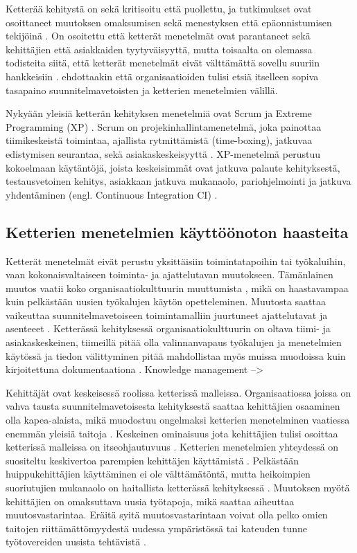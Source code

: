Ketterää kehitystä on sekä kritisoitu että puollettu, ja tutkimukset ovat
osoittaneet muutoksen omaksumisen sekä menestyksen että epäonnistumisen
tekijöinä . On osoitettu että ketterät menetelmät ovat
parantaneet sekä kehittäjien että asiakkaiden tyytyväisyyttä, mutta toisaalta on
olemassa todisteita siitä, että ketterät menetelmät eivät välttämättä sovellu
suuriin hankkeisiin .  ehdottaakin että
organisaatioiden tulisi etsiä itselleen sopiva tasapaino suunnitelmavetoisten ja
ketterien menetelmien välillä.

Nykyään yleisiä ketterän kehityksen menetelmiä ovat Scrum ja Extreme Programming
(XP) . Scrum on projekinhallintamenetelmä, joka painottaa
tiimikeskeistä toimintaa, ajallista rytmittämistä (time-boxing), jatkuvaa
edistymisen seurantaa, sekä asiakaskeskeisyyttä .
XP-menetelmä perustuu kokoelmaan käytäntöjä, joista keskeisimmät ovat jatkuva
palaute kehityksestä, testausvetoinen kehitys, asiakkaan jatkuva mukanaolo,
pariohjelmointi ja jatkuva yhdentäminen (engl. Continuous Integration
CI) .

\subsection{Ketterien menetelmien käyttöönoton haasteita}

Ketterät menetelmät eivät perustu yksittäisiin toimintatapoihin tai työkaluihin,
vaan kokonaisvaltaiseen toiminta- ja ajattelutavan muutokseen. Tämänlainen
muutos vaatii koko organisaatiokulttuurin muuttumista , mikä
on haastavampaa kuin pelkästään uusien työkalujen käytön opetteleminen. Muutosta
saattaa vaikeuttaa suunnitelmavetoiseen toimintamalliin juurtuneet ajattelutavat
ja asenteeet . Ketterässä kehityksessä
organisaatiokulttuurin on oltava tiimi- ja asiakaskeskeinen, tiimeillä pitää
olla valinnanvapaus työkalujen ja menetelmien käytössä ja tiedon välittyminen
pitää mahdollistaa myös muissa muodoissa kuin kirjoitettuna dokumentaationa
.
Knowledge management -->

Kehittäjät ovat keskeisessä roolissa ketterissä malleissa. Organisaatiossa
joissa on vahva tausta suunnitelmavetoisesta kehityksestä saattaa kehittäjien
osaaminen olla kapea-alaista, mikä muodostuu ongelmaksi ketterien menetelminen
vaatiessa enemmän yleisiä taitoja . Keskeinen ominaisuus
jota kehittäjien tulisi osoittaa ketterissä malleissa on itseohjautuvuus
. Ketterien menetelmien yhteydessä on suositeltu keskivertoa
parempien kehittäjen käyttämistä . Pelkästään
huippukehittäjien käyttäminen ei ole välttämätöntä, mutta heikoimpien
suoriutujien mukanaolo on haitallista ketterässä kehityksessä
. Muutoksen myötä kehittäjien on omaksuttava uusia
työtapoja, mikä saattaa aiheuttaa muutosvastarintaa. Eräitä syitä
muutosvastarintaan voivat olla pelko omien taitojen riittämättömyydestä uudessa
ympäristössä tai kateuden tunne työtovereiden uusista tehtävistä
.

